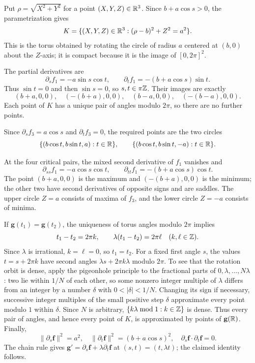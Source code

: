 \documentclass[11pt,oneside]{article}
\begin{document}
\begin{solution}
Put $\rho=\sqrt{X^2+Y^2}$ for a point $(X,Y,Z)\in\mathbb{R}^3$. Since $b+a\cos s>0$, the parametrization gives
\[
 K=\{(X,Y,Z)\in\mathbb{R}^3:(\rho-b)^2+Z^2=a^2\}.
\]
This is the torus obtained by rotating the circle of radius $a$ centered at $(b,0)$ about the $Z$-axis; it is compact because it is the image of $[0,2\pi]^2$.

\begin{exercisesubparts}
\item The partial derivatives are
\[
 \partial_s f_1=-a\sin s\cos t,
 \qquad \partial_t f_1=-(b+a\cos s)\sin t.
\]
Thus $\sin t=0$ and then $\sin s=0$, so $s,t\in\pi\mathbb{Z}$. Their images are exactly
\[
 (b+a,0,0),\quad (-(b+a),0,0),\quad
 (b-a,0,0),\quad (-(b-a),0,0).
\]
Each point of $K$ has a unique pair of angles modulo $2\pi$, so there are no further points.
\item Since $\partial_s f_3=a\cos s$ and $\partial_t f_3=0$, the required points are the two circles
\[
 \{(b\cos t,b\sin t,a):t\in\mathbb{R}\},\qquad
 \{(b\cos t,b\sin t,-a):t\in\mathbb{R}\}.
\]
\item At the four critical pairs, the mixed second derivative of $f_1$ vanishes and
\[
 \partial_{ss}f_1=-a\cos s\cos t,
 \qquad \partial_{tt}f_1=-(b+a\cos s)\cos t.
\]
The point $(b+a,0,0)$ is the maximum and $(-(b+a),0,0)$ is the minimum; the other two have second derivatives of opposite signs and are saddles. The upper circle $Z=a$ consists of maxima of $f_3$, and the lower circle $Z=-a$ consists of minima.
\item If $\mathbf g(t_1)=\mathbf g(t_2)$, the uniqueness of torus angles modulo $2\pi$ implies
\[
 t_1-t_2=2\pi k,\qquad \lambda(t_1-t_2)=2\pi\ell
 \quad(k,\ell\in\mathbb{Z}).
\]
Since $\lambda$ is irrational, $k=\ell=0$, so $t_1=t_2$.
For a fixed first angle $s$, the values $t=s+2\pi k$ have second angles $\lambda s+2\pi k\lambda$ modulo $2\pi$. To see that the rotation orbit is dense, apply the pigeonhole principle to the fractional parts of $0,\lambda,\ldots,N\lambda$: two lie within $1/N$ of each other, so some nonzero integer multiple of $\lambda$ differs from an integer by a number $\delta$ with $0<|\delta|<1/N$. Changing its sign if necessary, successive integer multiples of the small positive step $\delta$ approximate every point modulo $1$ within $\delta$. Since $N$ is arbitrary, $\{k\lambda\bmod1:k\in\mathbb{Z}\}$ is dense. Thus every pair of angles, and hence every point of $K$, is approximated by points of $\mathbf g(\mathbb{R})$.
Finally,
\[
 \|\partial_s\mathbf f\|^2=a^2,\quad
 \|\partial_t\mathbf f\|^2=(b+a\cos s)^2,\quad
 \partial_s\mathbf f\cdot\partial_t\mathbf f=0.
\]
The chain rule gives $\mathbf g'=\partial_s\mathbf f+\lambda\partial_t\mathbf f$ at $(s,t)=(t,\lambda t)$; the claimed identity follows.
\end{exercisesubparts}
\end{solution}
\end{document}
